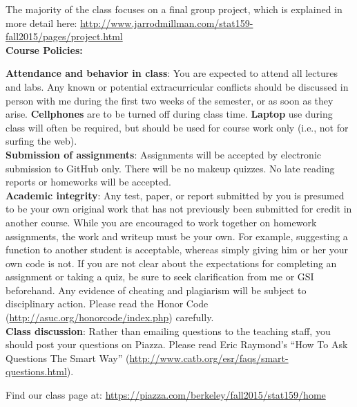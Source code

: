 \documentclass[11pt]{article}
\begin{document}
The majority of the class focuses on a final group project, which is
explained in more detail here:
 \url{http://www.jarrodmillman.com/stat159-fall2015/pages/project.html}\\


\textbf{\large Course Policies:}

\textbf{Attendance and behavior in class}: You are expected to attend all lectures
and labs.  Any known or potential extracurricular conflicts should be discussed
in person with me during the first two weeks of the semester, or as
soon as they arise. \textbf{Cellphones} are to be turned off during class time.
\textbf{Laptop} use during class will often be required, but should be
used for course work only (i.e., not for surfing the web).\\

\textbf{Submission of assignments}: Assignments will be accepted by electronic
submission to GitHub only.  There will be no makeup quizzes. No
late reading reports or homeworks will be accepted. \\ %

\textbf{Academic integrity}: Any test, paper, or report submitted by you is presumed
to be your own original work that has not previously been submitted for credit
in another course. While you are encouraged to work together on homework
assignments, the work and writeup must be your own. For example, suggesting a
function to another student is acceptable, whereas simply giving him or her
your own code is not.  If you are not clear about the expectations for
completing an assignment or taking a quiz, be sure to seek clarification from
me or GSI beforehand. Any evidence of cheating and plagiarism will
be subject to disciplinary action.  Please read the Honor
Code (\url{http://asuc.org/honorcode/index.php}) carefully.\\

\textbf{Class discussion}: 
Rather than emailing questions to the teaching staff, you should post
your questions on Piazza. Please read Eric Raymond's ``How To Ask Questions
The Smart Way'' (\url{http://www.catb.org/esr/faqs/smart-questions.html}).

Find our class page at: \url{https://piazza.com/berkeley/fall2015/stat159/home}\\
\end{document}
